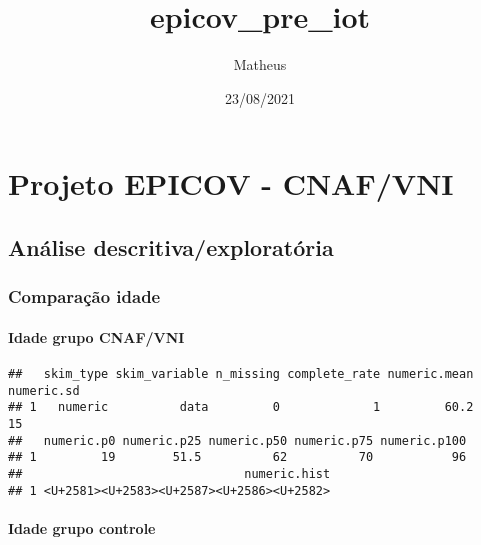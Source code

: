 \documentclass[
]{article}
\title{epicov\_pre\_iot}
\author{Matheus}
\date{23/08/2021}
\newenvironment{Shaded}{\begin{snugshade}}{\end{snugshade}}
\newcommand{\FunctionTok}[1]{\textcolor[rgb]{0.00,0.00,0.00}{#1}}
\newcommand{\NormalTok}[1]{#1}
\newcommand{\SpecialCharTok}[1]{\textcolor[rgb]{0.00,0.00,0.00}{#1}}
\begin{document}
\maketitle

\hypertarget{projeto-epicov---cnafvni}{%
\section{\texorpdfstring{\textbf{Projeto EPICOV -
CNAF/VNI}}{Projeto EPICOV - CNAF/VNI}}\label{projeto-epicov---cnafvni}}

\hypertarget{anuxe1lise-descritivaexploratuxf3ria}{%
\subsection{\texorpdfstring{\textbf{Análise
descritiva/exploratória}}{Análise descritiva/exploratória}}\label{anuxe1lise-descritivaexploratuxf3ria}}

\hypertarget{comparauxe7uxe3o-idade}{%
\subsubsection{\texorpdfstring{\textbf{Comparação
idade}}{Comparação idade}}\label{comparauxe7uxe3o-idade}}

\hypertarget{idade-grupo-cnafvni}{%
\paragraph{\texorpdfstring{\textbf{Idade grupo
CNAF/VNI}}{Idade grupo CNAF/VNI}}\label{idade-grupo-cnafvni}}

\begin{Shaded}
\end{Shaded}

\begin{verbatim}
##   skim_type skim_variable n_missing complete_rate numeric.mean numeric.sd
## 1   numeric          data         0             1         60.2         15
##   numeric.p0 numeric.p25 numeric.p50 numeric.p75 numeric.p100
## 1         19        51.5          62          70           96
##                               numeric.hist
## 1 <U+2581><U+2583><U+2587><U+2586><U+2582>
\end{verbatim}

\hypertarget{idade-grupo-controle}{%
\paragraph{\texorpdfstring{\textbf{Idade grupo
controle}}{Idade grupo controle}}\label{idade-grupo-controle}}
\end{document}
